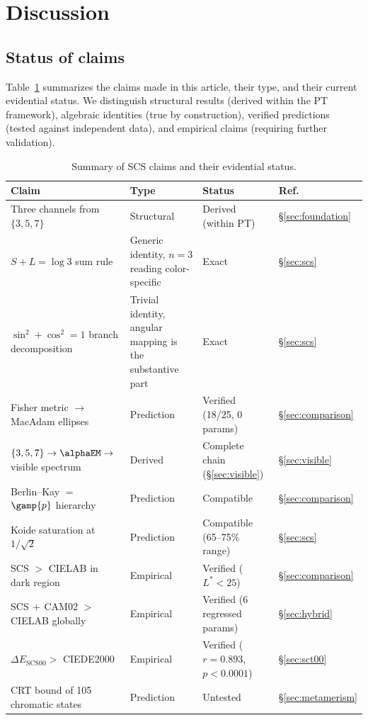 \documentclass[12pt,a4paper]{article}
\begin{document}
\section{Discussion}
\label{sec:discussion}

\subsection{Status of claims}

Table~\ref{tab:claims} summarizes the claims made in this article,
their type, and their current evidential status. We distinguish
structural results (derived within the PT framework), algebraic
identities (true by construction), verified predictions (tested against
independent data), and empirical claims (requiring further validation).

\begin{table}[ht]
\centering
\caption{Summary of SCS claims and their evidential status.}
\label{tab:claims}
\begin{tabular}{llll}
\toprule
\textbf{Claim} & \textbf{Type} & \textbf{Status} & \textbf{Ref.} \\
\midrule
Three channels from $\{3,5,7\}$ & Structural & Derived (within PT) & \S\ref{sec:foundation} \\
$S + L = \log 3$ sum rule & Generic identity, $n=3$ reading color-specific & Exact & \S\ref{sec:scs} \\
$\sin^2 + \cos^2 = 1$ branch decomposition & Trivial identity, angular mapping is the substantive part & Exact & \S\ref{sec:scs} \\
Fisher metric $\to$ MacAdam ellipses & Prediction & Verified (18/25, 0 params) & \S\ref{sec:comparison} \\
$\{3,5,7\} \to \alphaEM \to$ visible spectrum & Derived & Complete chain (\S\ref{sec:visible}) & \S\ref{sec:visible} \\
Berlin--Kay $=$ $\gamp{p}$ hierarchy & Prediction & Compatible & \S\ref{sec:comparison} \\
Koide saturation at $1/\sqrt{2}$ & Prediction & Compatible (65--75\% range) & \S\ref{sec:scs} \\
SCS $>$ CIELAB in dark region & Empirical & Verified ($L^*<25$) & \S\ref{sec:comparison} \\
SCS$\,+\,$CAM02 $>$ CIELAB globally & Empirical & Verified (6 regressed params) & \S\ref{sec:hybrid} \\
$\Delta E_{\mathrm{SCS00}} >$ CIEDE2000 & Empirical & Verified ($r=0.893$, $p<0.0001$) & \S\ref{sec:sct00} \\
CRT bound of 105 chromatic states & Prediction & Untested & \S\ref{sec:metamerism} \\
\bottomrule
\end{tabular}
\end{table}
\end{document}
